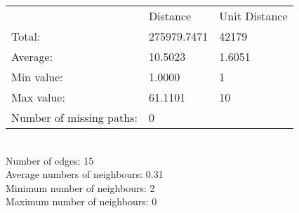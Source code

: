 \begin{tabular}{lll}
 & Distance & Unit Distance\\
Total: & 275979.7471 & 42179\\
Average: & 10.5023 & 1.6051\\
Min value: & 1.0000 & 1\\
Max value: & 61.1101 & 10\\
\hline
Number of missing paths: & 0 &\\
\end{tabular}\\
Number of edges: 15\\
Average numbers of neighbours: 0.31\\
Minimum number of neighbours: 2\\
Maximum number of neighbours: 0\\
